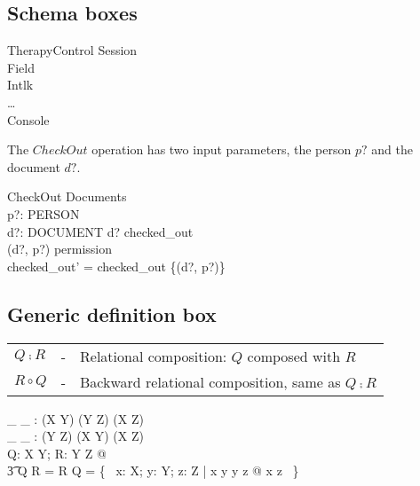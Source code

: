 \subsection{Schema boxes} \label{sect:schema} %

\begin{schema}{TherapyControl}
	Session \\
	Field \\
	Intlk \\
	\dots \\
	Console \\
\end{schema}


The $CheckOut$ operation has two input parameters, the person $p?$ and
the document $d?$.

\begin{schema}{CheckOut}
	\Delta Documents \\
	p?: PERSON \\
	d?: DOCUMENT
\where
	d? \notin \dom checked\_out \\
	(d?, p?) \in permission \\
	checked\_out' = checked\_out \cup \{(d?, p?)\}
\end{schema}

\subsection*{Generic definition box}


\begin{tabular}{l c l}
$Q \comp R$ & - & Relational composition: $Q$ composed with $R$ \\
$R \circ Q$ & - & Backward relational composition, same as $Q \comp R$ \\
\end{tabular}

\begin{gendef}[X,Y,Z]
	\_ \comp \_ : (X \rel Y) \cross (Y \rel Z) \fun (X \rel Z) \\
	\_ \circ \_ : (Y \rel Z) \cross (X \rel Y) \fun (X \rel Z) \\
\where
	\forall Q: X \rel Y; R: Y \rel Z @ \\
\t3		Q \comp R = R \circ Q = \{~ x: X; y: Y; z: Z | x  y \land y  z @ x \mapsto z ~\}
\end{gendef}

